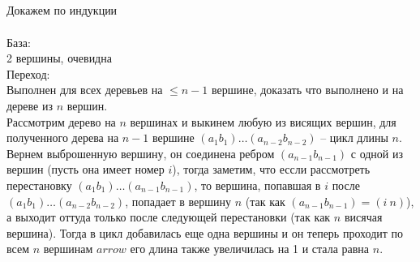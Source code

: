 		\subsection{}
		Докажем по индукции\\
		\\
		База:\\
		2 вершины, очевидна\\
		Переход:\\
		Выполнен для всех деревьев на $\leqslant n-1$ вершине, доказать что выполнено и на дереве из $n$ вершин.\\
		Рассмотрим дерево на $n$ вершинах и выкинем любую из висящих вершин, для полученного дерева на $n-1$ вершине $(a_1 b_1)\ldots(a_{n-2} b_{n-2})$ -- цикл длины $n$. Вернем выброшенную вершину, он соединена ребром $(a_{n-1} b_{n-1})$ с одной из вершин (пусть она имеет номер $i$), тогда заметим, что ессли рассмотреть перестановку $(a_1 b_1)\ldots(a_{n-1} b_{n-1})$, то вершина, попавшая в $i$ после $(a_1 b_1)\ldots(a_{n-2} b_{n-2})$, попадает в вершину $n$ (так как $(a_{n-1} b_{n-1}) = (i\ n)$), а выходит оттуда только после следующей перестановки (так как $n$ висячая вершина). Тогда в цикл добавилась еще одна вершины и он теперь проходит по всем $n$ вершинам $arrow$ его длина также увеличилась на 1 и стала равна $n$.
			
